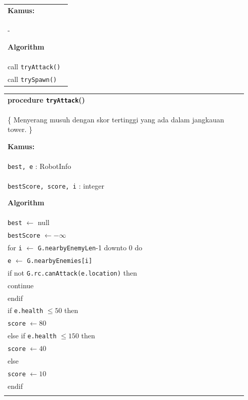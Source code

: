 \documentclass{article}
\newenvironment{pseudobox}
{
\centering
\begin{longtable}{|p{0.94\linewidth}|}
\hline
}
{
\\ \hline
\end{longtable}
\vspace{0.05cm}
}
\begin{document}
\begin{enumerate}[label=\alph*.]
\begin{enumerate}[label=\alph*.]
\begin{pseudobox}
\textbf{Kamus:} \\
\hspace*{1.5em}-

\textbf{Algorithm} \\
\hspace*{1.5em}call \texttt{tryAttack()} \\
\hspace*{1.5em}call \texttt{trySpawn()}
\end{pseudobox}

\begin{pseudobox}
\textbf{procedure \texttt{tryAttack}()} \\
\{ Menyerang musuh dengan skor tertinggi yang ada dalam jangkauan tower. \}

\textbf{Kamus:} \\
\hspace*{1.5em}\texttt{best, e} : RobotInfo \\
\hspace*{1.5em}\texttt{bestScore, score, i} : integer

\textbf{Algorithm} \\
\hspace*{1.5em}\texttt{best} $\leftarrow$ null \\
\hspace*{1.5em}\texttt{bestScore} $\leftarrow -\infty$ \\

\hspace*{1.5em}for \texttt{i} $\leftarrow$ \texttt{G.nearbyEnemyLen}-1 downto 0 do \\
\hspace*{3em}\texttt{e} $\leftarrow$ \texttt{G.nearbyEnemies[i]} \\

\hspace*{3em}if not \texttt{G.rc.canAttack(e.location)} then \\
\hspace*{4.5em}continue \\
\hspace*{3em}endif \\

\hspace*{3em}if \texttt{e.health} $\leq 50$ then \\
\hspace*{4.5em}\texttt{score} $\leftarrow 80$ \\
\hspace*{3em}else if \texttt{e.health} $\leq 150$ then \\
\hspace*{4.5em}\texttt{score} $\leftarrow 40$ \\
\hspace*{3em}else \\
\hspace*{4.5em}\texttt{score} $\leftarrow 10$ \\
\hspace*{3em}endif \\


\end{pseudobox}
\end{enumerate}
\end{enumerate}
\end{document}
